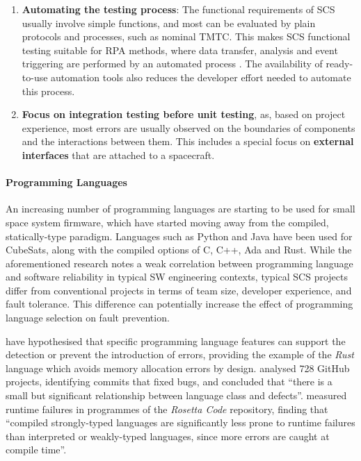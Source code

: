 \documentclass[a4paper,nobib,justified,final]{tufte-book}
\begin{document}
\begin{enumerate}
	\item \textbf{Automating the testing process}: The functional requirements of \acs{SCS} usually involve simple functions, and most can be evaluated by plain protocols and processes, such as nominal \acs{TMTC}. This makes \acs{SCS} functional testing suitable for \acf{RPA} methods, where data transfer, analysis and event 
	triggering are performed by an automated process \autocite{hofmannRoboticProcessAutomation2020}. The availability of ready-to-use automation tools also reduces the developer effort needed to automate this process.
	\item \textbf{Focus on integration testing before unit testing}, as, based on project experience, most errors are usually observed on the boundaries of components and the interactions between them. This includes a special focus on \textbf{external interfaces} that are attached to a spacecraft.
\end{enumerate}

\paragraph{Programming Languages}

An increasing number of programming languages are starting to be used for small space system firmware, which have started moving away from the compiled, statically-type paradigm. Languages such as Python \autocite{hollidayPyCubedOpenSourceRadiationTested2019} and Java \autocite{dorinSuitabilityJavaSatellite2019} %
have been used for CubeSats, along with the compiled options of C, C++, Ada and Rust.
While the aforementioned research notes a weak correlation between programming language and software reliability in typical \acs{SW} engineering contexts, typical \acs{SCS} projects differ from conventional projects in terms of team size, developer experience, and fault tolerance. This difference can potentially increase the effect of programming language selection on fault prevention.

\citeauthor{ashmoreProgrammingLanguageEvaluation2022} have hypothesised that specific programming language features can support the detection or prevent the introduction of errors, providing the example of the \emph{Rust} language which avoids memory allocation errors by design. \citeauthor{rayLargescaleStudyProgramming2017} \autocite{rayLargescaleStudyProgramming2017} analysed 728 GitHub projects, identifying commits that fixed bugs, and concluded that ``there is a small but significant relationship between language class and defects''.
\citeauthor{nanzComparativeStudyProgramming2015} \autocite{nanzComparativeStudyProgramming2015} measured runtime failures in programmes of the \emph{Rosetta Code} repository, finding that ``compiled strongly-typed languages are significantly less prone to runtime failures than interpreted or weakly-typed languages, since more errors are caught at compile time''.
\end{document}
